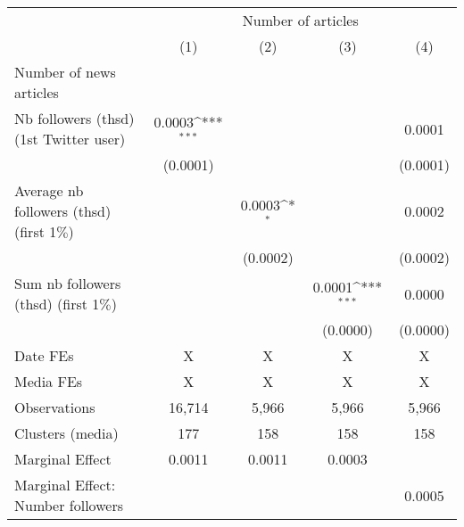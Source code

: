 {
\def\sym#1{\ifmmode^{#1}\else\(^{#1}\)\fi}
\begin{tabular}{l*{4}{c}}
\hline\hline
                    &\multicolumn{4}{c}{Number of articles}                                                 \\\cmidrule(lr){2-5}
                    &\multicolumn{1}{c}{(1)}         &\multicolumn{1}{c}{(2)}         &\multicolumn{1}{c}{(3)}         &\multicolumn{1}{c}{(4)}         \\
\hline
Number of news articles&                     &                     &                     &                     \\
Nb followers (thsd) (1st Twitter user)&      0.0003\sym{***}&                     &                     &      0.0001         \\
                    &    (0.0001)         &                     &                     &    (0.0001)         \\
Average nb followers (thsd) (first 1$\%$)&                     &      0.0003\sym{*}  &                     &      0.0002         \\
                    &                     &    (0.0002)         &                     &    (0.0002)         \\
Sum nb followers (thsd) (first 1$\%$)&                     &                     &      0.0001\sym{***}&      0.0000         \\
                    &                     &                     &    (0.0000)         &    (0.0000)         \\
\hline
Date FEs            &           X         &           X         &           X         &           X         \\
Media FEs           &           X         &           X         &           X         &           X         \\
Observations        &      16,714         &       5,966         &       5,966         &       5,966         \\
Clusters (media)    &         177         &         158         &         158         &         158         \\
Marginal Effect     &      0.0011         &      0.0011         &      0.0003         &                     \\
Marginal Effect: Number followers&                     &                     &                     &      0.0005         \\
\hline\hline
\end{tabular}
}
